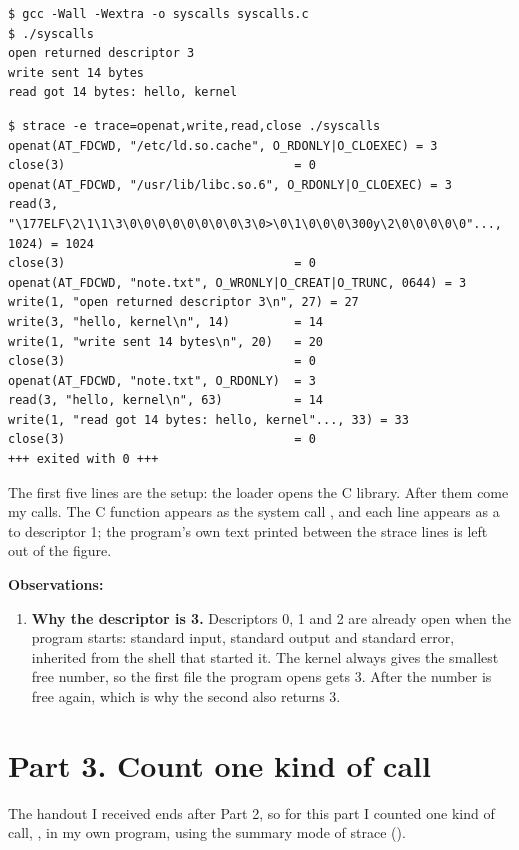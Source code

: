 \documentclass[11pt,a4paper]{article}
\begin{document}
\begin{lstlisting}[caption={Compiling and running syscalls}]
$ gcc -Wall -Wextra -o syscalls syscalls.c
$ ./syscalls
open returned descriptor 3
write sent 14 bytes
read got 14 bytes: hello, kernel
\end{lstlisting}

\begin{lstlisting}[caption={The same program seen with strace}]
$ strace -e trace=openat,write,read,close ./syscalls
openat(AT_FDCWD, "/etc/ld.so.cache", O_RDONLY|O_CLOEXEC) = 3
close(3)                                = 0
openat(AT_FDCWD, "/usr/lib/libc.so.6", O_RDONLY|O_CLOEXEC) = 3
read(3, "\177ELF\2\1\1\3\0\0\0\0\0\0\0\0\3\0>\0\1\0\0\0\300y\2\0\0\0\0\0"..., 1024) = 1024
close(3)                                = 0
openat(AT_FDCWD, "note.txt", O_WRONLY|O_CREAT|O_TRUNC, 0644) = 3
write(1, "open returned descriptor 3\n", 27) = 27
write(3, "hello, kernel\n", 14)         = 14
write(1, "write sent 14 bytes\n", 20)   = 20
close(3)                                = 0
openat(AT_FDCWD, "note.txt", O_RDONLY)  = 3
read(3, "hello, kernel\n", 63)          = 14
write(1, "read got 14 bytes: hello, kernel"..., 33) = 33
close(3)                                = 0
+++ exited with 0 +++
\end{lstlisting}

The first five lines are the setup: the loader opens the C library. After them come my calls.
The C function  appears as the system call , and each 
line appears as a  to descriptor 1; the program's own text printed between the
strace lines is left out of the figure.

\textbf{Observations:}
\begin{enumerate}
  \item \textbf{Why the descriptor is 3.} Descriptors 0, 1 and 2 are already open when the
  program starts: standard input, standard output and standard error, inherited from the shell
  that started it. The kernel always gives the smallest free number, so the first file the
  program opens gets 3. After  the number is free again, which is why the second
   also returns 3.
\end{enumerate}

\section{Part 3. Count one kind of call}

The handout I received ends after Part 2, so for this part I counted one kind of call,
, in my own program, using the summary mode of strace ().
\end{document}
